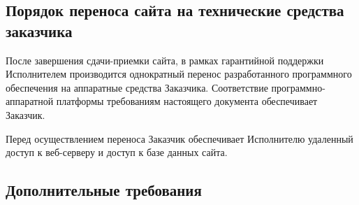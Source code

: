 \subsection{Порядок переноса сайта на технические средства заказчика}

После завершения сдачи-приемки сайта, в рамках гарантийной поддержки Исполнителем производится однократный перенос разработанного программного обеспечения на аппаратные средства Заказчика. Соответствие программно-аппаратной платформы требованиям настоящего документа обеспечивает Заказчик.

Перед осуществлением переноса Заказчик обеспечивает Исполнителю удаленный доступ к веб-серверу и доступ к базе данных сайта.

\subsection{Дополнительные требования}
